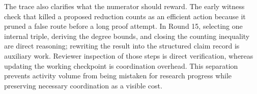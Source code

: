 The trace also clarifies what the numerator should reward. The early witness check
that killed a proposed reduction counts as an efficient action because it pruned a
false route before a long proof attempt. In Round 15, selecting one internal triple,
deriving the degree bounds, and closing the counting inequality are direct reasoning;
rewriting the result into the structured claim record is auxiliary work. Reviewer
inspection of those steps is direct verification, whereas updating the working
checkpoint is coordination overhead. This separation prevents activity volume from being mistaken for research
progress while preserving necessary coordination as a visible cost.
